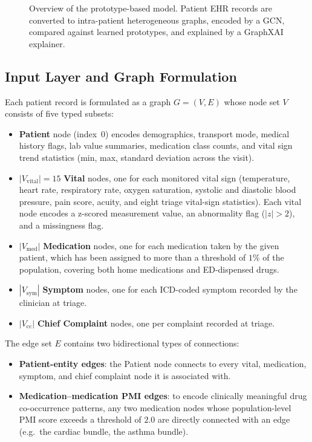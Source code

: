 \begin{figure}[htbp]
    \centering
    \caption{Overview of the prototype-based model. Patient EHR records are converted to intra-patient heterogeneous graphs, encoded by a GCN, compared
             against learned prototypes, and explained by a GraphXAI explainer.}
    \label{fig:framework_diagram}
\end{figure}

\subsection{Input Layer and Graph Formulation}

Each patient record is formulated as a graph $G = (V, E)$ whose node
set $V$ consists of five typed subsets:

\begin{itemize}
  \item \textbf{Patient} node (index~0) encodes demographics, transport mode, medical history flags, lab value summaries, medication class counts, and vital sign trend statistics (min, max, standard deviation across the visit).
  \item $|V_\text{vital}| = 15$ \textbf{Vital} nodes, one for each monitored vital sign (temperature, heart rate, respiratory rate, oxygen saturation, systolic and diastolic blood pressure, pain score, acuity, and eight triage vital-sign statistics). Each vital node encodes a z-scored measurement value, an abnormality flag ($|z| > 2$), and a missingness flag.
  \item $|V_\text{med}|$ \textbf{Medication} nodes, one for each medication taken by the given patient, which has been assigned to more than a threshold of $1\%$ of the population, covering both home medications and ED-dispensed drugs.
  \item $|V_\text{sym}|$ \textbf{Symptom} nodes, one for each ICD-coded symptom recorded by the clinician at triage.
  \item $|V_\text{cc}|$ \textbf{Chief Complaint} nodes, one per complaint recorded at triage.
\end{itemize}

The edge set $E$ contains two bidirectional types of connections:

\begin{itemize}
  \item \textbf{Patient-entity edges}: the Patient node connects to every vital, medication, symptom, and chief complaint node it is associated with.
  \item \textbf{Medication--medication PMI edges}: to encode clinically meaningful drug co-occurrence patterns, any two medication nodes whose population-level PMI score exceeds a threshold of $2.0$ are directly connected with an edge  (e.g.\ the cardiac bundle, the asthma bundle).
\end{itemize}

